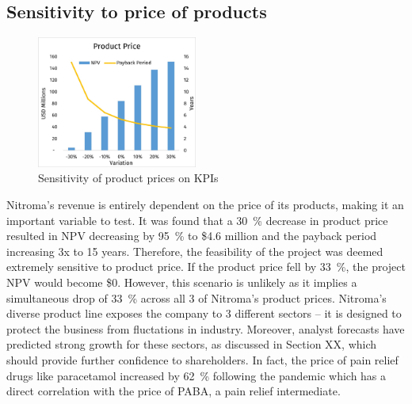 \subsection{Sensitivity to price of products}
\begin{figure}
    \caption{Sensitivity of product prices on KPIs}
    \label{Sensitivity_ProductPrice}
    \includegraphics[width=0.47\textwidth]{chapters/6-economics/figures/Sensitivity_ProductPrice.jpg}
\end{figure}
Nitroma’s revenue is entirely dependent on the price of its products, making it an important variable to test. It was found that a \SI{30}{\percent} decrease in product price resulted in NPV decreasing by \SI{95}{\percent} to \$4.6 million and the payback period increasing 3x to 15 years. Therefore, the feasibility of the project was deemed extremely sensitive to product price.  If the product price fell by \SI{33}{\percent}, the project NPV would become \$0. However, this scenario is unlikely as it implies a simultaneous drop of \SI{33}{\percent} across all 3 of Nitroma’s product prices. Nitroma’s diverse product line exposes the company to 3 different sectors – it is designed to protect the business from fluctations in industry. Moreover, analyst forecasts have predicted strong growth for these sectors, as discussed in Section XX, which should provide further confidence to shareholders. In fact, the price of pain relief drugs like paracetamol increased by \SI{62}{\percent} following the pandemic which has a direct correlation with the price of PABA, a pain relief intermediate.

